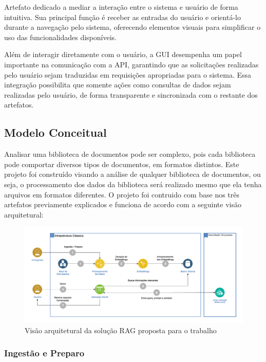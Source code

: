 \documentclass[a4paper, 12pt]{article}
\begin{document}
    Artefato dedicado a mediar a interação entre o sistema e usuário de forma intuitiva. Sua principal função é receber as entradas do usuário e orientá-lo durante a navegação pelo sistema, oferecendo elementos visuais para simplificar o uso das funcionalidades disponíveis.

    Além de interagir diretamente com o usuário, a GUI desempenha um papel importante na comunicação com a API, garantindo que as solicitações realizadas pelo usuário sejam traduzidas em requisições apropriadas para o sistema. Essa integração possibilita que somente ações como consultas de dados sejam realizadas pelo usuário, de forma transparente e sincronizada com o restante dos artefatos.
    
    \subsection{Modelo Conceitual}
    
    Analisar uma biblioteca de documentos pode ser complexo, pois cada biblioteca pode comportar diversos tipos de documentos, em formatos distintos. Este projeto foi construído visando a análise de qualquer biblioteca de documentos, ou seja, o processamento dos dados da biblioteca será realizado mesmo que ela tenha arquivos em formatos diferentes. O projeto foi contruido com base nos três artefatos previamente explicados e funciona de acordo com a seguinte visão arquitetural:

    \begin{figure}[h]
        \includegraphics[scale=0.3]{architecture.png}
        \centering
        \caption{Visão arquitetural da solução RAG proposta para o trabalho}
        \centering
    \end{figure}

    \subsubsection{Ingestão e Preparo}
    
\end{document}
